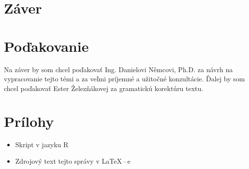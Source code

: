 \documentclass[12pt,a4paper,oneside,final]{article}
\theoremstyle{definition}
\theoremstyle{remark}
\numberwithin{equation}{section}
\begin{document}
\section{Záver}

\section*{Poďakovanie}
Na záver by som chcel poďakovať Ing. Danielovi Němcovi, Ph.D. za návrh na vypracovanie
tejto témi a za veľmi príjemné a užitočné konzultácie. Ďalej by som chcel poďakovať Ester
Železňákovej za gramatickú korektúru textu.




\newpage
\renewcommand{\thesection}{\Alph{section}}
\setcounter{section}{0}
\renewcommand{\thepage}{\roman{page}}
\setcounter{page}{1}

\section{Prílohy}

\begin{itemize}
    \item Skript v jazyku R
    \item Zdrojový text tejto správy v \LaTeX\,--\,e
\end{itemize}
\end{document}
